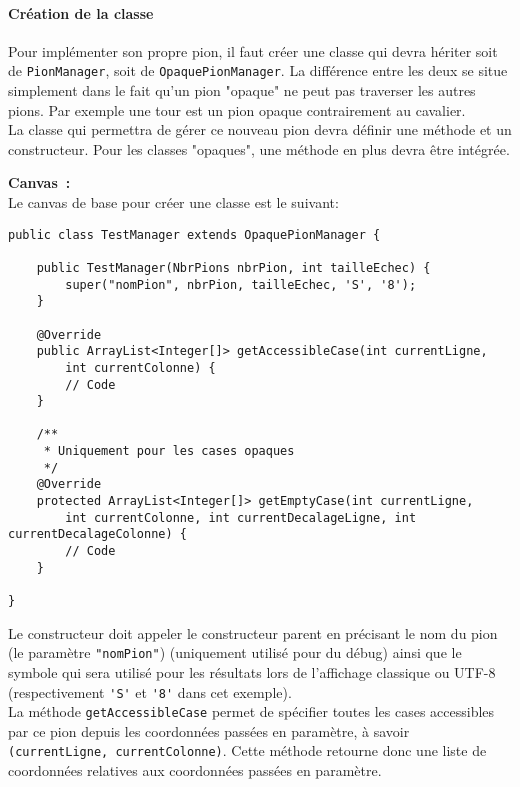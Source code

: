 \documentclass[a4paper,11pt]{article}
\begin{document}
		\paragraph{Création de la classe}
        	Pour implémenter son propre pion, il faut créer une classe qui devra hériter soit de \verb|PionManager|, soit de \verb|OpaquePionManager|. La différence entre les deux se situe simplement dans le fait qu'un pion "opaque" ne peut pas traverser les autres pions. Par exemple une tour est un pion opaque contrairement au cavalier.\\

			La classe qui permettra de gérer ce nouveau pion devra définir une méthode et un constructeur. Pour les classes "opaques", une méthode en plus devra être intégrée.

			\textbf{Canvas~:}\\
            Le canvas de base pour créer une classe est le suivant:
\begin{verbatim}
public class TestManager extends OpaquePionManager {

    public TestManager(NbrPions nbrPion, int tailleEchec) {
        super("nomPion", nbrPion, tailleEchec, 'S', '8');
    }

    @Override
    public ArrayList<Integer[]> getAccessibleCase(int currentLigne,
    	int currentColonne) {
        // Code
    }

    /**
     * Uniquement pour les cases opaques
     */
    @Override
    protected ArrayList<Integer[]> getEmptyCase(int currentLigne, 
    	int currentColonne, int currentDecalageLigne, int currentDecalageColonne) {
        // Code
    }

}
\end{verbatim}

			Le constructeur doit appeler le constructeur parent en précisant le nom du pion (le paramètre \verb|"nomPion"|) (uniquement utilisé pour du débug) ainsi que le symbole qui sera utilisé pour les résultats lors de l'affichage classique ou UTF-8 (respectivement \verb|'S'| et \verb|'8'| dans cet exemple).\\

          	La méthode \verb|getAccessibleCase| permet de spécifier toutes les cases accessibles par ce pion depuis les coordonnées passées en paramètre, à savoir \verb|(currentLigne, currentColonne)|.  Cette méthode retourne donc une liste de coordonnées relatives aux coordonnées passées en paramètre.\\ 
\end{document}
